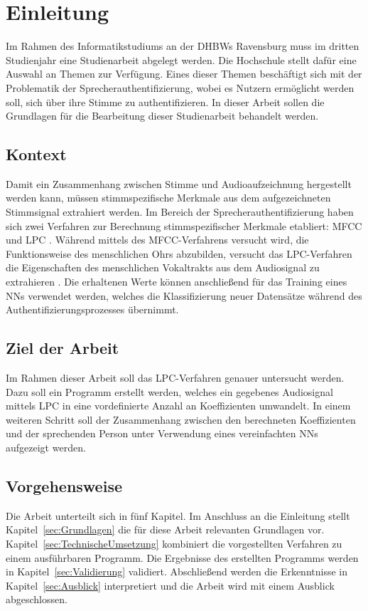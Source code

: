 \section{Einleitung}\label{sec:Einleitung}
Im Rahmen des Informatikstudiums an der \acp{DHBW} Ravensburg muss im dritten Studienjahr eine Studienarbeit abgelegt werden.
Die Hochschule stellt dafür eine Auswahl an Themen zur Verfügung.
Eines dieser Themen beschäftigt sich mit der Problematik der Sprecherauthentifizierung, wobei es Nutzern ermöglicht werden soll, sich über ihre Stimme zu authentifizieren.
In dieser Arbeit sollen die Grundlagen für die Bearbeitung dieser Studienarbeit behandelt werden.

\subsection{Kontext}
Damit ein Zusammenhang zwischen Stimme und Audioaufzeichnung hergestellt werden kann, müssen stimm\-spezifische Merkmale aus dem aufgezeichneten Stimmsignal extrahiert werden.
Im Bereich der Sprecherauthentifizierung haben sich zwei Verfahren zur Berechnung stimm\-spezifischer Merkmale etabliert: \ac{MFCC} und \ac{LPC} \autocite[vgl.][S. 116]{sidorov_text-independent_2010} \autocite[vgl.][S. 726]{chelali_text_2017}.
Während mittels des \ac{MFCC}-Verfahrens versucht wird, die Funktionsweise des menschlichen Ohrs abzubilden, versucht das \ac{LPC}-Verfahren die Eigenschaften des menschlichen Vokaltrakts aus dem Audiosignal zu extrahieren \autocite[vgl.][S. 117]{sidorov_text-independent_2010}.
Die erhaltenen Werte können anschließend für das Training eines \acp{NN} verwendet werden, welches die Klassifizierung neuer Datensätze während des Authentifizierungsprozesses übernimmt.

\subsection{Ziel der Arbeit}
Im Rahmen dieser Arbeit soll das \ac{LPC}-Verfahren genauer untersucht werden.
Dazu soll ein Programm erstellt werden, welches ein gegebenes Audiosignal mittels \ac{LPC} in eine vordefinierte Anzahl an Koeffizienten umwandelt.
In einem weiteren Schritt soll der Zusammenhang zwischen den berechneten Koeffizienten und der sprechenden Person unter Verwendung eines vereinfachten \acp{NN} aufgezeigt werden.

\subsection{Vorgehensweise}
Die Arbeit unterteilt sich in fünf Kapitel.
Im Anschluss an die Einleitung stellt Kapitel~\ref{sec:Grundlagen} die für diese Arbeit relevanten Grundlagen vor.
Kapitel~\ref{sec:TechnischeUmsetzung} kombiniert die vorgestellten Verfahren zu einem ausführbaren Programm.
Die Ergebnisse des erstellten Programms werden in Kapitel~\ref{sec:Validierung} validiert.
Abschließend werden die Erkenntnisse in Kapitel~\ref{sec:Ausblick} interpretiert und die Arbeit wird mit einem Ausblick abgeschlossen.